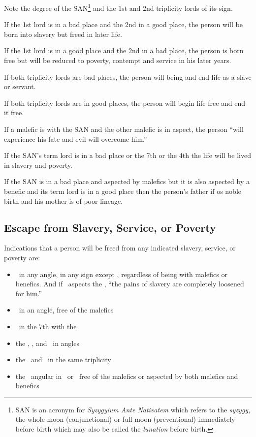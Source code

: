 Note the degree of the SAN\footnote{SAN is an acronym for \textsl{Syzygyium Ante Nativatem} which refers to the \textsl{syzygy}, the whole-moon (conjunctional) or full-moon (preventional) immediately before birth which may also be called the \textsl{lunation} before birth.} and the 1st and 2nd triplicity lords of its sign. 

If the 1st lord is in a bad place and the 2nd in a good place, the person will be born into slavery but freed in later life.

If the 1st lord is in a good place and the 2nd in a bad place, the person is born free but will be reduced to poverty, contempt and service in his later years.

If both triplicity lords are bad places, the person will being and end life as a slave or servant.

If both triplicity lords are in good places, the person will begin life free and end it free.

If a malefic is with the SAN and the other malefic is in aspect, the person ``will experience his fate and evil will overcome him.''

If the SAN's term lord is in a bad place or the 7th or the 4th the life will be lived in slavery and poverty.

If the SAN is in a bad place and aspected by malefics but it is also aspected by a benefic and its term lord is in a good place then the person's father if os noble birth and his mother is of poor lineage.

\subsection{Escape from Slavery, Service, or Poverty}
Indications that a person will be freed from any indicated slavery, service, or poverty are:
\begin{itemize}[topsep=0em, itemsep=0em]
\item \Jupiter\,  in any angle, in any sign except \Capricorn, regardless of being with malefics or benefics. And if \Jupiter\, aspects the \Moon, ``the pains of slavery are completely loosened for him.''

\item \Venus\, in an angle, free of the malefics

\item \Venus\,  in the 7th with the \Moon

\item the \Sun, \Moon, and \Mercury\, in angles
\item the \Sun\, and \Moon\, in the same triplicity
\item the \Moon\, angular in \Taurus\, or \Cancer\, free of the malefics or aspected by both malefics and benefics
\end{itemize}

